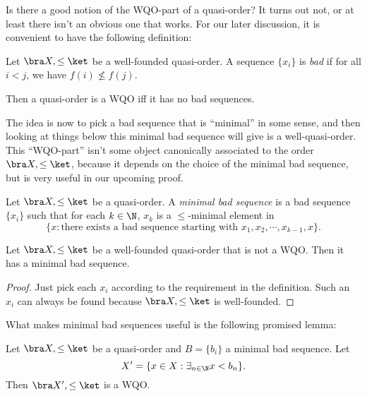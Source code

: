 \documentclass[a4paper]{article}
\begin{document}
Is there a good notion of the WQO-part of a quasi-order? It turns out not, or at least there isn't an obvious one that works. For our later discussion, it is convenient to have the following definition:

\begin{defi}
  Let $\bra X, \leq\ket$ be a well-founded quasi-order. A sequence $\{x_i\}$ is \emph{bad} if for all $i < j$, we have $f(i) \not\leq f(j)$.
\end{defi}
Then a quasi-order is a WQO iff it has no bad sequences.

The idea is now to pick a bad sequence that is ``minimal'' in some sense, and then looking at things below this minimal bad sequence will give is a well-quasi-order. This ``WQO-part'' isn't some object canonically associated to the order $\bra X, \leq\ket$, because it depends on the choice of the minimal bad sequence, but is very useful in our upcoming proof.

\begin{defi}
  Let $\bra X, \leq\ket$ be a quasi-order. A \emph{minimal bad sequence} is a bad sequence $\{x_i\}$ such that for each $k \in \N$, $x_k$ is a $\leq$-minimal element in
  \[
    \{x:\text{there exists a bad sequence starting with }x_1, x_2, \cdots, x_{k - 1}, x\}.
  \]
\end{defi}

\begin{lemma}
  Let $\bra X, \leq\ket$ be a well-founded quasi-order that is not a WQO. Then it has a minimal bad sequence.
\end{lemma}

\begin{proof}
  Just pick each $x_i$ according to the requirement in the definition. Such an $x_i$ can always be found because $\bra X, \leq\ket$ is well-founded.
\end{proof}

What makes minimal bad sequences useful is the following promised lemma:
\begin{lemma}
  Let $\bra X, \leq\ket$ be a quasi-order and $B = \{b_i\}$ a minimal bad sequence. Let
  \[
    X' = \{x \in X: \exists_{n \in \N} x < b_n\}.
  \]
  Then $\bra X', \leq\ket$ is a WQO.
\end{lemma}
\end{document}
